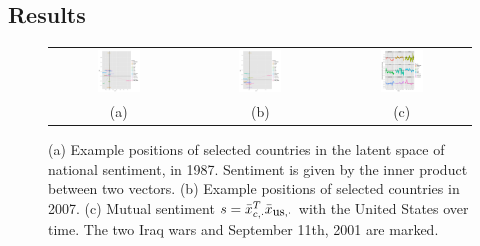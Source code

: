 \subsection{Results}
 \begin{figure}
  \begin{tabular}{ccc}
    \includegraphics[width=0.33\textwidth]{chapter_foreign_relations/figures/002_countries_by_ip_1987.pdf} &
    \includegraphics[width=0.33\textwidth]{chapter_foreign_relations/figures/002_countries_by_ip_2007.pdf} &
    \includegraphics[width=0.33\textwidth]{chapter_foreign_relations/figures/002_us_vs_everyone.pdf} \\
    (a) & (b) & (c) \\
  \end{tabular}
  \caption{
    (a) Example positions of selected countries in the latent space of national sentiment, in 1987. Sentiment is given by the inner product between two vectors.
    (b) Example positions of selected countries in 2007.
    (c) Mutual sentiment $s = \bar x_{c, \cdot}^T \bar x_{\mbox{\small us}, \cdot}$ with the United States over time. The two Iraq wars and September 11th, 2001 are marked.
  }
  \label{figure:figures}
\end{figure}

